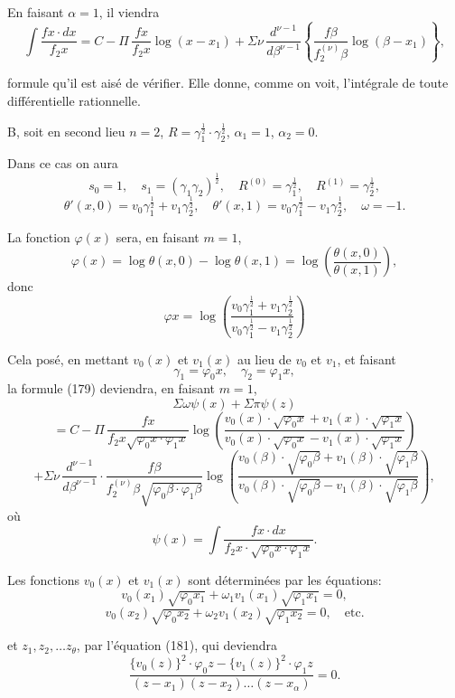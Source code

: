 \documentclass{article}
\begin{document}
En faisant $\alpha = 1$, il viendra
\[ \int \frac{f x \cdot dx}{f_2 x} = C - \Pi\,\frac{f x}{f_2 x}\log(x-x_1) + \Sigma\nu\,\frac{d^{\nu-1}}{d\beta^{\nu-1}} \left\{ \frac{f\beta}{f_2^{(\nu)}\beta}\log(\beta-x_1) \right\}, \tag{201} \]

formule qu'il est aisé de vérifier. Elle donne, comme on voit, l'intégrale de toute différentielle rationnelle.

B, soit en second lieu $n = 2$, $R = \gamma_1^{\frac{1}{2}} \cdot \gamma_2^{\frac{1}{2}}$, $\alpha_1 = 1$, $\alpha_2 = 0$.

Dans ce cas on aura
\[ s_0 = 1, \quad s_1 = (\gamma_1\gamma_2)^{\frac{1}{2}}, \quad R^{(0)} = \gamma_1^{\frac{1}{2}}, \quad R^{(1)} = \gamma_2^{\frac{1}{2}}, \]
\[ \theta'(x,0) = v_0\gamma_1^{\frac{1}{2}}+v_1\gamma_2^{\frac{1}{2}}, \quad \theta'(x,1) = v_0\gamma_1^{\frac{1}{2}}-v_1\gamma_2^{\frac{1}{2}}, \quad \omega = -1. \]

La fonction $\varphi(x)$ sera, en faisant $m = 1$,
\[ \varphi(x) = \log\theta(x,0)-\log\theta(x,1) = \log\left(\frac{\theta(x,0)}{\theta(x,1)}\right), \]
donc
\[ \varphi x = \log\left(\frac{v_0\gamma_1^{\frac{1}{2}}+v_1\gamma_2^{\frac{1}{2}}}{v_0\gamma_1^{\frac{1}{2}}-v_1\gamma_2^{\frac{1}{2}}}\right) \]

Cela posé, en mettant $v_0(x)$ et $v_1(x)$ au lieu de $v_0$ et $v_1$, et faisant
\[ \gamma_1 = \varphi_0 x, \quad \gamma_2 = \varphi_1 x, \]
la formule (179) deviendra, en faisant $m = 1$,
\[ \Sigma\omega\psi(x)+\Sigma\pi\psi(z) \]
\[ = C - \Pi\,\frac{f x}{f_2 x\sqrt{\varphi_0 x \cdot \varphi_1 x}}\log\left(\frac{v_0(x) \cdot \sqrt{\varphi_0 x}+v_1(x) \cdot \sqrt{\varphi_1 x}}{v_0(x) \cdot \sqrt{\varphi_0 x}-v_1(x) \cdot \sqrt{\varphi_1 x}}\right) \]
\[ + \Sigma\nu\,\frac{d^{\nu-1}}{d\beta^{\nu-1}} \cdot \frac{f\beta}{f_2^{(\nu)}\beta\sqrt{\varphi_0\beta \cdot \varphi_1\beta}}\log\left(\frac{v_0(\beta) \cdot \sqrt{\varphi_0\beta}+v_1(\beta) \cdot \sqrt{\varphi_1\beta}}{v_0(\beta) \cdot \sqrt{\varphi_0\beta}-v_1(\beta) \cdot \sqrt{\varphi_1\beta}}\right), \tag{202} \]
où
\[ \psi(x) = \int \frac{f x \cdot dx}{f_2 x \cdot \sqrt{\varphi_0 x \cdot \varphi_1 x}}. \]

Les fonctions $v_0(x)$ et $v_1(x)$ sont déterminées par les équations:
\[ v_0(x_1)\sqrt{\varphi_0 x_1}+\omega_1 v_1(x_1)\sqrt{\varphi_1 x_1} = 0, \]
\[ v_0(x_2)\sqrt{\varphi_0 x_2}+\omega_2 v_1(x_2)\sqrt{\varphi_1 x_2} = 0, \quad \text{etc.} \]

et $z_1, z_2, \ldots z_\theta$, par l'équation (181), qui deviendra
\[ \frac{\{v_0(z)\}^{2} \cdot \varphi_0 z-\{v_1(z)\}^{2} \cdot \varphi_1 z}{(z-x_1)(z-x_2)\ldots(z-x_\alpha)} = 0. \tag{203} \]
\end{document}
